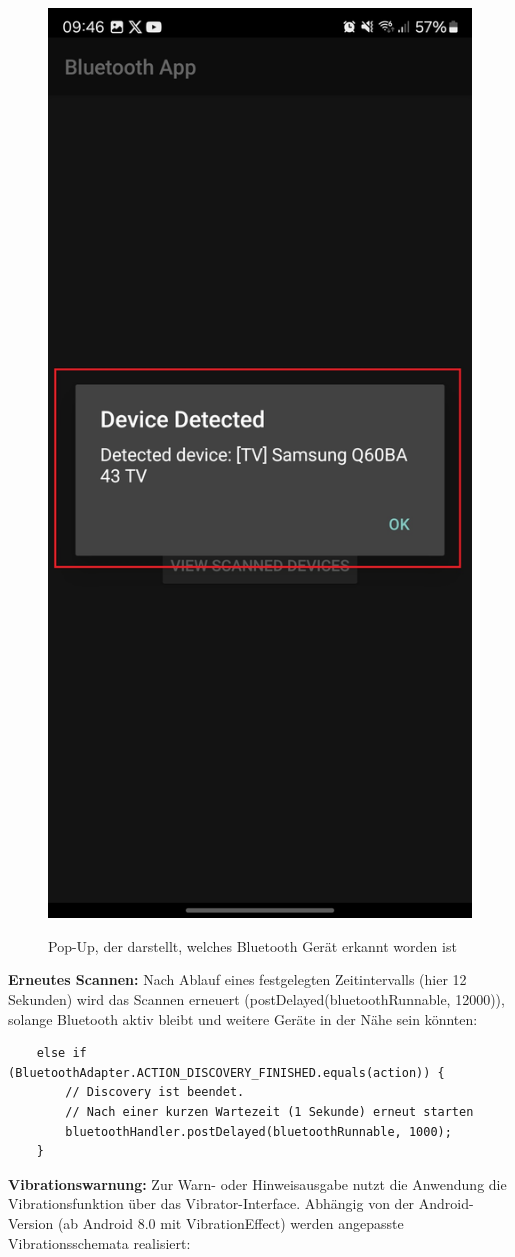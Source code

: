 \documentclass[a4paper, 12pt]{article} %
\begin{document}
\begin{spacing}{1.8}
    \begin{figure}[H]
        \includegraphics[width=0.5\linewidth]{images/Screenshot_20250113_094600_Bluetooth App.jpg}\\[1ex]
        \centering
        \caption{Pop-Up, der darstellt, welches Bluetooth Gerät erkannt worden ist\cite{lukiano12_lkw_assist}}
        \label{ABBILDUNG 76}
    \end{figure}

   
\textbf{Erneutes Scannen\cite{lukiano12_lkw_assist}:} Nach Ablauf eines festgelegten Zeitintervalls (hier 12 Sekunden) wird das Scannen erneuert (postDelayed(bluetoothRunnable, 12000)), 
solange Bluetooth aktiv bleibt und weitere Geräte in der Nähe sein könnten:

\begin{lstlisting}
    else if (BluetoothAdapter.ACTION_DISCOVERY_FINISHED.equals(action)) {
        // Discovery ist beendet.
        // Nach einer kurzen Wartezeit (1 Sekunde) erneut starten
        bluetoothHandler.postDelayed(bluetoothRunnable, 1000);
    }
    \end{lstlisting}

\textbf{Vibrationswarnung\cite{lukiano12_lkw_assist}:} Zur Warn- oder Hinweisausgabe nutzt die Anwendung die Vibrationsfunktion über das Vibrator-Interface. 
Abhängig von der Android-Version (ab Android 8.0 mit VibrationEffect) werden angepasste Vibrationsschemata realisiert:


\end{spacing}
\end{document}
